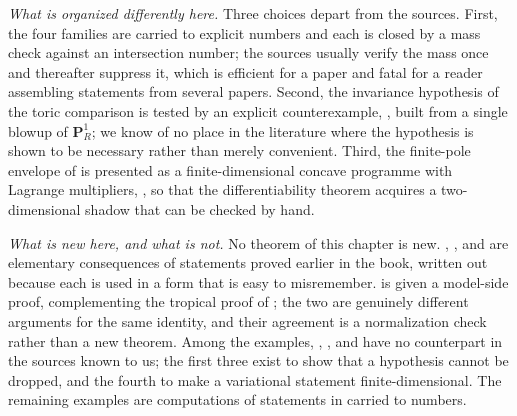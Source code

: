 \emph{What is organized differently here.}  Three choices depart from the
sources.  First, the four families are carried to explicit numbers and each
is closed by a mass check against an intersection number; the sources
usually verify the mass once and thereafter suppress it, which is efficient
for a paper and fatal for a reader assembling statements from several
papers.  Second, the invariance hypothesis of the toric comparison is tested
by an explicit counterexample, , built from a
single blowup of \(\mathbf P^1_R\); we know of no place in the literature
where the hypothesis is shown to be necessary rather than merely convenient.
Third, the finite-pole envelope of  is
presented as a finite-dimensional concave programme with Lagrange
multipliers, , so that the differentiability
theorem  acquires a
two-dimensional shadow that can be checked by hand.

\emph{What is new here, and what is not.}  No theorem of this chapter is
new.  , ,
 and  are elementary
consequences of statements proved earlier in the book, written out because
each is used in a form that is easy to misremember.
 is given a model-side proof, complementing
the tropical proof of ; the two are genuinely
different arguments for the same identity, and their agreement is a
normalization check rather than a new theorem.  Among the examples,
, ,
 and  have no
counterpart in the sources known to us; the first three exist to show that a
hypothesis cannot be dropped, and the fourth to make a variational statement
finite-dimensional.  The remaining examples are computations of statements
in \cite{BFJ15,BGJKK25,GJR26} carried to numbers.
